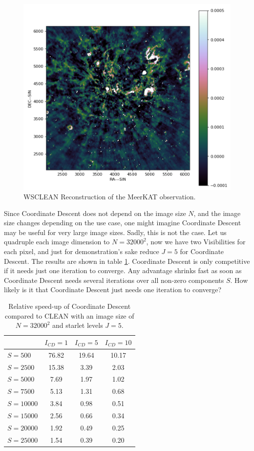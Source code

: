 \begin{figure}[h]
	\centering
	\includegraphics[width=0.6\linewidth]{./chapters/20.results/meerkat.png}
	\caption{WSCLEAN Reconstruction of the MeerKAT observation.}
	\label{results:wsclean}
\end{figure}

Since Coordinate Descent does not depend on the image size $N$, and the image size changes depending on the use case, one might imagine Coordinate Descent may be useful for very large image sizes. Sadly, this is not the case. Let us quadruple each image dimension to $N=32000^2$, now we have two Visibilities for each pixel, and just for demonstration's sake reduce $J=5$ for Coordinate Descent. The results are shown in table \ref{res:cd:large:table}. Coordinate Descent is only competitive if it needs just one iteration to converge. Any advantage shrinks fast as soon as Coordinate Descent needs several iterations over all non-zero components $S$. How likely is it that Coordinate Descent just needs one iteration to converge?

\begin{table}[h!]
	\begin{center}
		\begin{tabular}{l|c|c|c} %
			& $I_{CD} = 1$ & $I_{CD} = 5$ &  $I_{CD} = 10$\\
			\hline
			$S=500$ & 76.82 &  19.64 & 10.17 \\
			$S=2500$ & 15.38 &  3.39 & 2.03 \\
			$S=5000$ & 7.69 &  1.97 & 1.02 \\
			$S=7500$ & 5.13 &  1.31 & 0.68 \\
			$S=10000$ & 3.84 &  0.98 & 0.51 \\
			\hline
			$S=15000$ & 2.56 &  0.66 & 0.34 \\
			$S=20000$ & 1.92 &  0.49 & 0.25 \\
			$S=25000$ & 1.54 &  0.39 & 0.20 \\
		\end{tabular}
		\caption{Relative speed-up of Coordinate Descent compared to CLEAN with an image size of $N=32000^2$ and starlet levels $J=5$. }
		\label{res:cd:large:table}
	\end{center}
\end{table}

